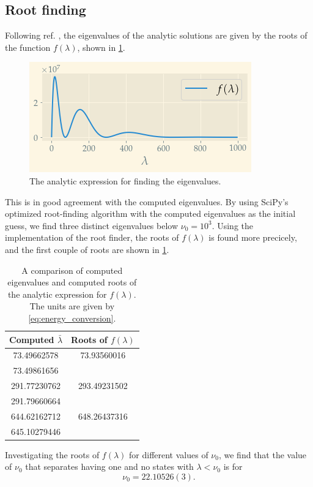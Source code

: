 \subsection{Root finding}

Following ref. \cite{assignment}, the eigenvalues of the analytic solutions are given by the roots of the function $f(\lambda)$, shown in \cref{fig:f}. 
\begin{figure}
	\centering
	\includegraphics[width=\linewidth]{img/f}
	\caption{The analytic expression for finding the eigenvalues. }
	\label{fig:f}
\end{figure}
This is in good agreement with the computed eigenvalues. By using SciPy's \cite{2020SciPy-NMeth} optimized root-finding algorithm with the computed eigenvalues as the initial guess, we find three distinct eigenvalues below $\nu_0 = 10^3$.
Using the implementation of the root finder, the roots of $f(\lambda)$ is found more precicely, and the first couple of roots are shown in \cref{tab:roots}. 
\begin{table}
	\centering
\begin{tabular}{|c|c|}
	\hline
Computed $\bar\lambda$ & Roots of $f(\lambda) $\\
	\hline 
	73.49662578 & 73.93560016 \\ 

	73.49861656 &  \\ 

	291.77230762 & 293.49231502 \\ 
 
	291.79660664 &  \\ 
 
	644.62162712 & 648.26437316 \\ 

	645.10279446 &  \\
	\hline
\end{tabular}
	\caption{A comparison of computed eigenvalues and computed roots of the analytic expression for $f(\lambda)$. The units are given by \cref{eq:energy_conversion}. }
	\label{tab:roots}
\end{table}
Investigating the roots of $f(\lambda)$ for different values of $\nu_0$, we find that the value of $\nu_0$ that separates having one and no states with $\lambda < \nu_0$ is for 
\begin{equation} 
\nu_0 = 22.10526(3).
\end{equation}